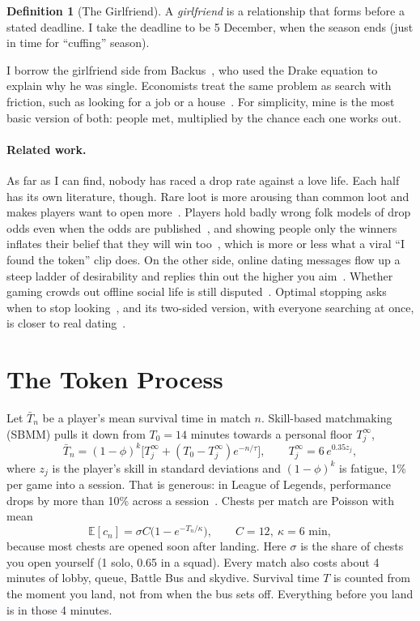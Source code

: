 \documentclass[11pt]{article}
\theoremstyle{definition}
\newtheorem{definition}{Definition}[section]
\theoremstyle{plain}
\begin{document}
\begin{definition}[The Girlfriend]
A \emph{girlfriend} is a relationship that forms before a stated deadline. I take the deadline to be 5 December, when the season ends (just in time for ``cuffing'' season).
\end{definition}

I borrow the girlfriend side from Backus~\cite{backus}, who used the Drake equation to explain why he was single. Economists treat the same problem as search with friction, such as looking for a job or a house~\cite{mortensen}. For simplicity, mine is the most basic version of both: people met, multiplied by the chance each one works out.

\paragraph{Related work.} As far as I can find, nobody has raced a drop rate against a love life. Each half has its own literature, though. Rare loot is more arousing than common loot and makes players want to open more~\cite{larche}. Players hold badly wrong folk models of drop odds even when the odds are published~\cite{wen,xiao}, and showing people only the winners inflates their belief that they will win too~\cite{cordes}, which is more or less what a viral ``I found the token'' clip does. On the other side, online dating messages flow up a steep ladder of desirability and replies thin out the higher you aim~\cite{bruch}. Whether gaming crowds out offline social life is still disputed~\cite{kowert,domahidi}. Optimal stopping asks when to stop looking~\cite{chow}, and its two-sided version, with everyone searching at once, is closer to real dating~\cite{eriksson}.

\section{The Token Process}

Let $\bar T_n$ be a player's mean survival time in match $n$. Skill-based matchmaking (SBMM) pulls it down from $T_0 = 14$ minutes towards a personal floor $T^\infty_j$,
\begin{equation}
\bar T_{n} = (1-\phi)^{k}\big[T^\infty_j + (T_0 - T^\infty_j)e^{-n/\tau}\big], \qquad T^\infty_j = 6\,e^{0.35 z_j},
\end{equation}
where $z_j$ is the player's skill in standard deviations and $(1-\phi)^k$ is fatigue, 1\% per game into a session. That is generous: in League of Legends, performance drops by more than 10\% across a session~\cite{sapienza}. Chests per match are Poisson with mean
\begin{equation}
\mathbb{E}[c_n] = \sigma C\big(1 - e^{-T_n/\kappa}\big), \qquad C = 12,\ \kappa = 6 \text{ min},
\end{equation}
because most chests are opened soon after landing. Here $\sigma$ is the share of chests you open yourself (1 solo, 0.65 in a squad). Every match also costs about 4 minutes of lobby, queue, Battle Bus and skydive. Survival time $T$ is counted from the moment you land, not from when the bus sets off. Everything before you land is in those 4 minutes.
\end{document}
